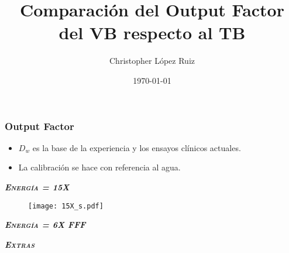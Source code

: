 \documentclass[aspectratio=169,xcolor=dvipsnames,t]{beamer}
\title{Comparación del Output Factor del VB respecto al TB}
\date{\today}
\author{Christopher López Ruiz}
\institute{INCan}
\begin{document}
\frame[plain,bg=fondo.jpg]{\titlepage}


\begin{frame}
    \frametitle{Output Factor}

    \begin{itemize}
          \item  $D_{w}$ es la base de la experiencia y los ensayos clínicos actuales.
          \item La calibración se hace con referencia al agua.
    \end{itemize}

\end{frame}


\begin{frame}[standout]
      \centering\LARGE
      \textbf{\itshape\scshape Energía = 15X}
\end{frame}

\begin{frame}

      \vspace{1cm}

      \begin{figure}
            \centering
            \texttt{[image: 15X\_s.pdf]}
      \end{figure}

\end{frame}


\begin{frame}[standout]
      \centering\LARGE
      \textbf{\itshape\scshape Energía = 6X FFF} 
\end{frame}


\begin{frame}[standout]
      \centering\LARGE
      \textbf{\itshape\scshape Extras}
\end{frame}

\End
\begin{frame}[standout,bg=white.png]
      \centering
\end{frame}
\end{document}

